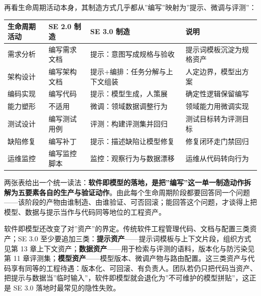 \documentclass[
]{ctexbook}
\newcounter{none}
\begin{document}
再看生命周期活动本身，其制造方式几乎都从''编写''映射为''提示、微调与评测''：

{\def\LTcaptype{none} %
\begin{longtable}[]{@{}
  >{\raggedright\arraybackslash}p{}
  >{\raggedright\arraybackslash}p{}
  >{\raggedright\arraybackslash}p{}
  >{\raggedright\arraybackslash}p{}@{}}
\toprule\noalign{}
\begin{minipage}[b]{\linewidth}\raggedright
生命周期活动
\end{minipage} & \begin{minipage}[b]{\linewidth}\raggedright
SE 2.0 制造
\end{minipage} & \begin{minipage}[b]{\linewidth}\raggedright
SE 3.0 制造
\end{minipage} & \begin{minipage}[b]{\linewidth}\raggedright
说明
\end{minipage} \\
\midrule\noalign{}
\endhead
\bottomrule\noalign{}
\endlastfoot
需求分析 & 编写需求文档 & 提示：意图写成规格与验收 &
提示词模板沉淀为规格资产 \\
架构设计 & 编写架构文档 & 提示+编排：任务分解与上下文组装 &
人定边界，模型出方案 \\
编码实现 & 编写代码 & 提示：模型生成，人策展 & 确定性逻辑保留编写 \\
能力塑形 & 不适用 & 微调：领域数据调整行为 & 领域能力用微调实现 \\
测试设计 & 编写测试用例 & 评测：构建评测集并回归 &
测试目标转为评测目标 \\
缺陷修复 & 编写补丁 & 提示：描述缺陷让模型修复 & 修复闭环走门禁回归 \\
运维监控 & 编写监控脚本 & 监控：观察行为与数据漂移 &
运维从代码转向行为 \\
\end{longtable}
}

两张表给出一个统一读法：\textbf{软件即模型的落地，是把''编写''这一单一制造动作拆解为五要素各自的生产与验证动作}。由此每个生命周期阶段都要回答同一个问题------该阶段的产物由谁制造、由谁验证、可否回滚；能回答这个问题，才谈得上把模型、数据与提示当作与代码同等地位的工程资产。

软件即模型还改变了对''资产''的界定。传统软件工程管理代码、文档与配置三类资产；SE
3.0
至少要追加三类：\textbf{提示资产}------提示词模板与上下文片段，组织方式见第
13
章上下文资产；\textbf{数据资产}------用于检索与评测的语料，版本化与防污染见第
11
章评测集；\textbf{模型资产}------模型版本、微调产物与路由配置。这三类资产与代码享有同等的工程待遇：版本化、可回滚、有负责人。团队若仍只把代码当资产、把提示与数据当''临时输入''，软件即模型就会退化为''不可维护的模型拼贴''，这正是
SE 3.0 落地时最常见的隐性失败。
\end{document}

